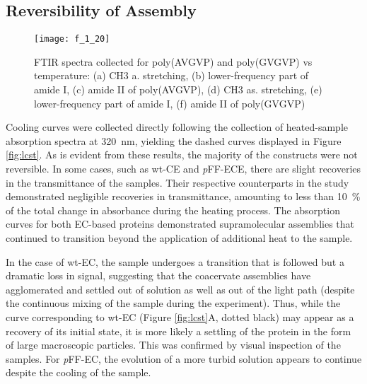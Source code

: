 \begin{refsection}
\subsection{Reversibility of Assembly}
\begin{figure}[h!] \centering \texttt{[image: f\_1\_20]}
    \caption[FTIR spectra collected for poly(AVGVP) and poly(GVGVP) vs
        temperature: (a) CH3 a. stretching, (b) lower-frequency part of amide I,
        (c) amide II of poly(AVGVP), (d) CH3 as. stretching, (e) lower-frequency
        part of amide I, (f) amide II of poly(GVGVP)]{FTIR spectra collected for
            poly(AVGVP) and poly(GVGVP) vs temperature: (a) CH3 a. stretching,
            (b) lower-frequency part of amide I, (c) amide II of poly(AVGVP),
            (d) CH3 as. stretching, (e) lower-frequency part of amide I, (f)
            amide II of poly(GVGVP)\cite{Schmidt2005}}\label{fig:lcst_cabello}
        \end{figure}
Cooling curves were collected directly following the collection of heated-sample
absorption spectra at \SI{320}{\nm}, yielding the dashed curves displayed in
Figure \ref{fig:lcst}. As is evident from these results, the majority of the
constructs were not reversible. In some cases, such as wt-CE and \emph{p}FF-ECE,
there are slight recoveries in the transmittance of the samples. Their
respective counterparts in the study demonstrated negligible recoveries in
transmittance, amounting to less than \SI{10}{\percent} of the total change in
absorbance during the heating process. The absorption curves for both EC-based
proteins demonstrated supramolecular assemblies that continued to transition
beyond the application of additional heat to the sample.

In the case of wt-EC, the sample undergoes a transition that is followed but a
dramatic loss in signal, suggesting that the coacervate assemblies have
agglomerated and settled out of solution as well as out of the light path
(despite the continuous mixing of the sample during the experiment). Thus, while
the curve corresponding to wt-EC (Figure \ref{fig:lcst}A, dotted black) may
appear as a recovery of its initial state, it is more likely a settling of the
protein in the form of large macroscopic particles. This was confirmed by visual
inspection of the samples. For \emph{p}FF-EC, the evolution of a more turbid
solution appears to continue despite the cooling of the sample.


\end{refsection}
